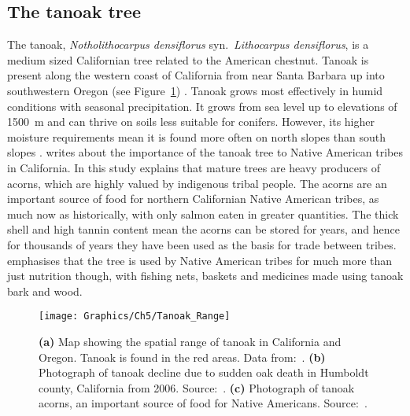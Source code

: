 \subsection{The tanoak tree}

The tanoak, \textit{Notholithocarpus densiflorus} syn.~\textit{Lithocarpus densiflorus}, is a medium sized Californian tree related to the American chestnut. Tanoak is present along the western coast of California from near Santa Barbara up into southwestern Oregon (see Figure~\ref{fig:ch5:tanoak_range}) \citep{tappeiner_lithocarpus_1990}. Tanoak grows most effectively in humid conditions with seasonal precipitation. It grows from sea level up to elevations of \SI{1500}{\meter} and can thrive on soils less suitable for conifers. However, its higher moisture requirements mean it is found more often on north slopes than south slopes \citep{tappeiner_lithocarpus_1990}. \citet{bowcutt_tanoak_2013} writes about the importance of the tanoak tree to Native American tribes in California. In this study \citeauthor{bowcutt_tanoak_2013} explains that mature trees are heavy producers of acorns, which are highly valued by indigenous tribal people. The acorns are an important source of food for northern Californian Native American tribes, as much now as historically, with only salmon eaten in greater quantities. The thick shell and high tannin content mean the acorns can be stored for years, and hence for thousands of years they have been used as the basis for trade between tribes. \citeauthor{bowcutt_tanoak_2013} emphasises that the tree is used by Native American tribes for much more than just nutrition though, with fishing nets, baskets and medicines made using tanoak bark and wood.

\begin{figure}
    \begin{center}
        \texttt{[image: Graphics/Ch5/Tanoak\_Range]}
        \caption[The tanoak tree: pictures and map of spatial range]{\textbf{(a)} Map showing the spatial range of tanoak in California and Oregon. Tanoak is found in the red areas. Data from:~\citet{plant_maps}. \textbf{(b)} Photograph of tanoak decline due to sudden oak death in Humboldt county, California from 2006. Source:~\citet{tanoak_pict2}. \textbf{(c)} Photograph of tanoak acorns, an important source of food for Native Americans. Source:~\citet{tanoak_pict}.\label{fig:ch5:tanoak_range}}
    \end{center}
\end{figure}

